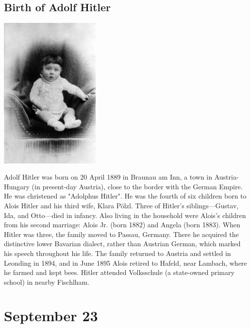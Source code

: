 \documentclass[11pt]{report}
\begin{document}
\subsection{Birth of Adolf Hitler}
\vspace{2mm}\begin{center}\includegraphics[width=5cm]{./img/infantHitler.jpg}\end{center}
Adolf Hitler was born on 20 April 1889 in Braunau am Inn, a town in Austria-Hungary (in present-day Austria), close to the border with the German Empire. He was christened as "Adolphus Hitler". He was the fourth of six children born to Alois Hitler and his third wife, Klara Pölzl. Three of Hitler's siblings—Gustav, Ida, and Otto—died in infancy. Also living in the household were Alois's children from his second marriage: Alois Jr. (born 1882) and Angela (born 1883). When Hitler was three, the family moved to Passau, Germany. There he acquired the distinctive lower Bavarian dialect, rather than Austrian German, which marked his speech throughout his life. The family returned to Austria and settled in Leonding in 1894, and in June 1895 Alois retired to Hafeld, near Lambach, where he farmed and kept bees. Hitler attended Volksschule (a state-owned primary school) in nearby Fischlham.
\section{September 23}
\end{document}
